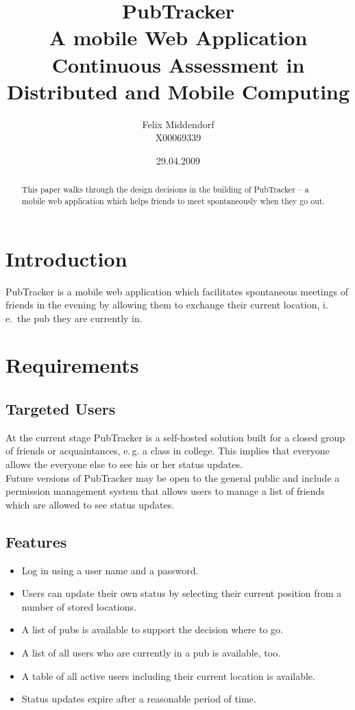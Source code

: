 \documentclass[a4paper,10pt]{scrartcl}
\title{PubTracker\\A mobile Web Application\\{\small Continuous Assessment in Distributed and Mobile Computing}}
\author{Felix Middendorf\\{\small X00069339}}
\date{29.04.2009}
\begin{document}
\maketitle
\begin{abstract}
This paper walks through the design decisions in the building of PubTracker --
a mobile web application which helps friends to meet spontaneously when they
go out.
\end{abstract}
\newpage
\tableofcontents
\newpage

\section{Introduction}
PubTracker is a mobile web application which facilitates spontaneous meetings
of friends in the evening by allowing them to exchange their current location,
i.\,e.\ the pub they are currently in.

\section{Requirements}
\subsection{Targeted Users}\label{r:user}
At the current stage PubTracker is a self-hosted solution built for a closed
group of friends or acquaintances, e.\,g. a class in college. This implies that everyone allows the
everyone else to see his or her status updates.\\
Future versions of PubTracker may be open to the general public and include a
permission management system that allows users to manage a list of friends
which are allowed to see status updates.

\subsection{Features}
\begin{itemize}
  \item Log in using a user name and a password.
  \item Users can update their own status by selecting their current position
  from a number of stored locations.
  \item A list of pubs is available to support the decision where to go.
  \item A list of all users who are currently in a pub is available, too.
  \item A table of all active users including their current location is
  available.
  \item Status updates expire after a reasonable period of time.
\end{itemize}
\end{document}
